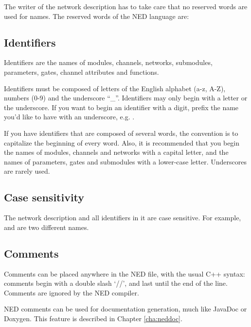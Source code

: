 The writer of the network description has to take care that no
reserved words are used for names. The reserved words of the
NED language are:



\subsection{Identifiers}

Identifiers are the names of modules, channels, networks,
submodules, parameters, gates, channel attributes and functions.

Identifiers must be composed of letters of the English alphabet (a-z, A-Z),
numbers (0-9) and the underscore ``\_''.
Identifiers may only begin with a letter or the underscore.
If you want to begin an identifier with a digit, prefix the name
you'd like to have with an underscore, e.g. .

If you have identifiers that are composed of several words, the convention
is to capitalize the beginning of every word. Also, it is recommended
that you begin the names of modules, channels and networks with
a capital letter, and the names of parameters, gates and submodules
with a lower-case letter. Underscores are rarely used.


\subsection{Case sensitivity}

The network description and all identifiers in it are case sensitive.
For example,  and  are two different names.


\subsection{Comments}

Comments can be placed anywhere in the NED file, with the usual C++
syntax: comments begin with a double slash `//', and last until
the end of the line. Comments are ignored by the NED compiler.

NED comments can be used for documentation generation,
much like JavaDoc or Doxygen. This feature is described in
Chapter \ref{cha:neddoc}.



